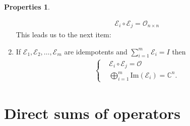 \documentclass{book}
\theoremstyle{definition}
\newtheorem{prop}{Properties}[section]
\newcommand{\E}{\mathcal{E}}
\newcommand{\ima}{\text{Im}}
\begin{document}
\begin{prop}
\begin{enumerate}
	\begin{align*}
	\boxed{\E_i \circ \E_j = \mathcal{O}_{n\times n}}
	\end{align*}
	This leads us to the next item:
	\item If $\E_1, \E_2, \dots, \E_m$ are idempotents and $\sum^m_{i=1}\E_i = I$ then 
	\begin{align*}
	\begin{cases}
	&\E_i \circ \E_j = \mathcal{O}\\
	&\bigoplus^m_{i=1}\ima(\E_i) = \mathbb{C}^n.
	\end{cases}
	\end{align*}
	\end{enumerate}
\end{prop}


































\section{Direct sums of operators}
\end{document}
